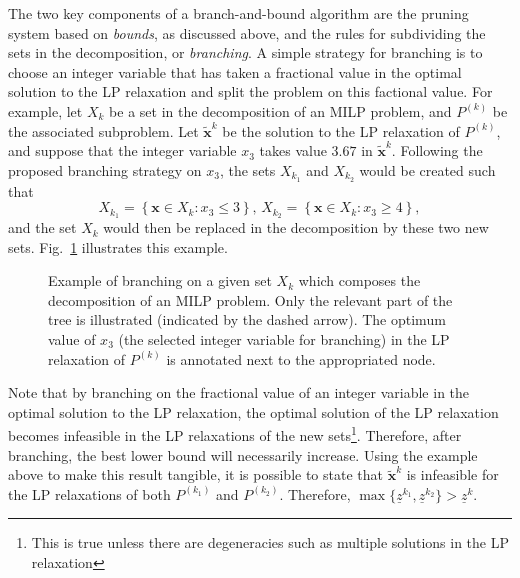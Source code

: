 The two key components of a branch-and-bound algorithm are the pruning system based on \emph{bounds}, as discussed above, and the rules for subdividing the sets in the decomposition, or \emph{branching}.
A simple strategy for branching is to choose an integer variable that has taken a fractional value in the optimal solution to the LP relaxation and split the problem on this factional value.
For example, let $X_k$ be a set in the decomposition of an MILP problem, and $P^{(k)}$ be the associated subproblem.
Let $\widetilde{\bm{x}}^{k}$ be the solution to the LP relaxation of $P^{(k)}$, and suppose that the integer variable $x_3$ takes value $3.67$ in $\widetilde{\bm{x}}^{k}$.
Following the proposed branching strategy on $x_3$, the sets $X_{k_1}$ and $X_{k_2}$ would be created such that \[
X_{k_1} = \left\{ \bm{x} \in X_k : x_3 \le 3 \right\} ,\, X_{k_2} = \left\{ \bm{x}\in X_k : x_3 \ge 4 \right\} 
,\] and the set $X_k$ would then be replaced in the decomposition by these two new sets.
Fig.~\ref{fig:branching-example} illustrates this example.

\begin{figure}[h]
    \centering
    \caption{Example of branching on a given set $X_k$ which composes the decomposition of an MILP problem. Only the relevant part of the tree is illustrated (indicated by the dashed arrow). The optimum value of $x_3$ (the selected integer variable for branching) in the LP relaxation of $P^{(k)}$ is annotated next to the appropriated node.}
    \label{fig:branching-example}
\end{figure}

Note that by branching on the fractional value of an integer variable in the optimal solution to the LP relaxation, the optimal solution of the LP relaxation becomes infeasible in the LP relaxations of the new sets\footnote{This is true unless there are degeneracies such as multiple solutions in the LP relaxation}.
Therefore, after branching, the best lower bound will necessarily increase.
Using the example above to make this result tangible, it is possible to state that $\widetilde{\bm{x}}^{k}$ is infeasible for the LP relaxations of both $P^{(k_1)}$ and $P^{(k_2)}$.
Therefore, $\max\{\underline{z}^{k_1},\underline{z}^{k_2}\} > \underline{z}^{k}$.

